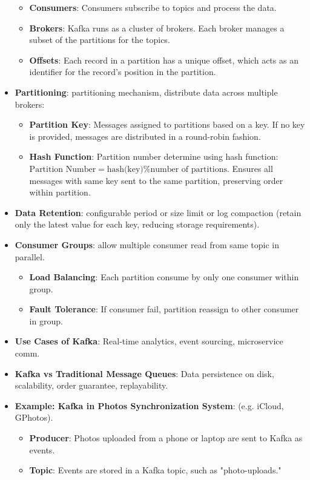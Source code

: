 \documentclass[a4paper, 9pt, landscape]{article}
\begin{document}
\begin{multicols*}{3}
\begin{itemize}
\begin{itemize}
	\item \textbf{Consumers}: Consumers subscribe to topics and process the data.
	\item \textbf{Brokers}: Kafka runs as a cluster of brokers. Each broker manages a subset of the partitions for the topics.
	\item \textbf{Offsets}: Each record in a partition has a unique offset, which acts as an identifier for the record's position in the partition.
	\end{itemize}
\item \textbf{Partitioning}: partitioning mechanism, distribute data across multiple brokers:
	\begin{itemize}
	\item \textbf{Partition Key}: Messages assigned to partitions based on a key. If no key is provided, messages are distributed in a round-robin fashion.
	\item \textbf{Hash Function}: Partition number determine using hash function: 
	$\text{Partition Number} = \text{hash(key)} \% \text{number of partitions}$. Ensures all messages with same key sent to the same partition, preserving order within partition.
	\end{itemize}
\item \textbf{Data Retention}: configurable period or size limit or log compaction (retain only the latest value for each key, reducing storage requirements).
\item \textbf{Consumer Groups}: allow multiple consumer read from same topic in parallel. 
	\begin{itemize}
	\item \textbf{Load Balancing}: Each partition consume by only one consumer within group.
	\item \textbf{Fault Tolerance}: If consumer fail, partition reassign to other consumer in group.
	\end{itemize}
\item \textbf{Use Cases of Kafka}: Real-time analytics, event sourcing, microservice comm.
\item \textbf{Kafka vs Traditional Message Queues}: Data persistence on disk, scalability, order guarantee, replayability.
\item \textbf{Example: Kafka in Photos Synchronization System}: (e.g. iCloud, GPhotos). 
	\begin{itemize}
	\item \textbf{Producer}: Photos uploaded from a phone or laptop are sent to Kafka as events.
	\item \textbf{Topic}: Events are stored in a Kafka topic, such as "photo-uploads."

\end{itemize}
\end{itemize}
\end{multicols*}
\end{document}
